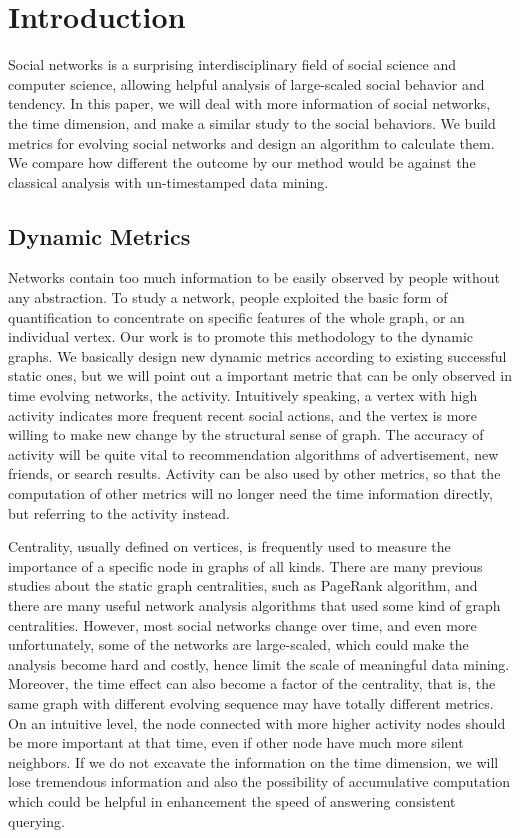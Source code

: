 \documentclass[12pt,abstract=true]{scrartcl}
\numberwithin{equation}{section}
\theoremstyle{definition}   \newtheorem{definition}{Definition}[section]
\theoremstyle{plain}        \newtheorem{theorem}{Theorem}[section]
\theoremstyle{plain}        \newtheorem{observation}{Observation}[section]
\theoremstyle{plain}        \newtheorem{fact}{Fact}[section]
\theoremstyle{plain}        \newtheorem{claim}{Claim}[section]
\theoremstyle{plain}        \newtheorem{lemma}[theorem]{Lemma}
\theoremstyle{plain}        \newtheorem{corollary}[theorem]{Corollary}
\theoremstyle{remark}       \newtheorem{example}{Example}[section]
\theoremstyle{remark}       \newtheorem{remark}{Remark}[section]
\begin{document}
\section{Introduction}
Social networks is a surprising interdisciplinary field of social science and
computer science, allowing helpful analysis of large-scaled social behavior
and tendency. In this paper, we will deal with more information of social
networks, the time dimension, and make a similar study to the social behaviors.
We build metrics for evolving social networks and design an algorithm to
calculate them. We compare how different the outcome by our method would be
against the classical analysis with un-timestamped data mining.

\subsection{Dynamic Metrics}
Networks contain too much information to be easily observed by people without
any abstraction. To study a network, people exploited the basic form of
quantification to concentrate on specific features of the whole graph, or an
individual vertex. Our work is to promote this methodology to the dynamic
graphs. We basically design new dynamic metrics according to existing
successful static ones, but we will point out a important metric that can be
only observed in time evolving networks, the activity. Intuitively speaking,
a vertex with high activity indicates more frequent recent social actions, and
the vertex is more willing to make new change by the structural sense of graph.
The accuracy of activity will be quite vital to recommendation algorithms of
advertisement, new friends, or search results. Activity can be also used by
other metrics, so that the computation of other metrics will no longer need the
time information directly, but referring to the activity instead.

Centrality, usually defined on vertices, is frequently used to measure the
importance of a specific node in graphs of all kinds. There are many previous
studies about the static graph centralities\cite{newman2010networks}, such as
PageRank algorithm\cite{page1999pagerank}, and there are many useful
network analysis algorithms that used some kind of graph centralities. However,
most social networks change over time, and even more unfortunately, some of the
networks are large-scaled, which could make the analysis become hard and
costly, hence limit the scale of meaningful data mining. Moreover, the time
effect can also become a factor of the centrality, that is, the same graph with
different evolving sequence may have totally different metrics. On an
intuitive level, the node connected with more higher activity nodes should be
more important at that time, even if other node have much more silent
neighbors. If we do not excavate the information on the time dimension, we will
lose tremendous information and also the possibility of accumulative
computation which could be helpful in enhancement the speed of answering
consistent querying.
\end{document}
